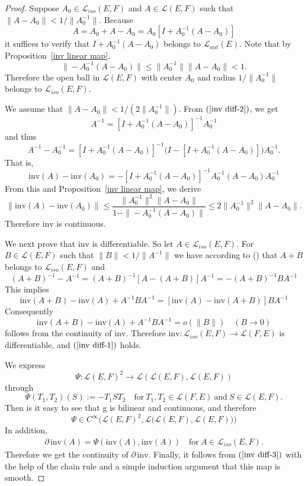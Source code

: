 \begin{proof}
Suppose $A_0\in\mathcal{L}_{iso}(E,F)$ and $A\in\mathcal{L}(E,F)$ such that $\|A-A_0\|<1/\|A_0^{-1}\|$. Because
\begin{equation}\label{inv diff-2}
A=A_0+A-A_0=A_0[I+A_0^{-1}(A-A_0)]
\end{equation}
it suffices to verify that $I+A_0^{-1}(A-A_0)$ belongs to $\mathcal{L}_{aut}(E)$. Note that by Proposition~\ref{inv linear map},
\[\|-A_0^{-1}(A-A_0)\|\leq \|A_0^{-1}\|\|A-A_0\|<1.\]
Therefore the open ball in $\mathcal{L}(E,F)$ with center $A_0$ and radius $1/\|A_0^{-1}\|$ belongs to $\mathcal{L}_{iso}(E,F)$.\par
We assume that $\|A-A_0\|<1/(2\|A_0^{-1}\|)$. From $(\ref{inv diff-2})$, we get
\[A^{-1}=[I+A_0^{-1}(A-A_0)]^{-1}A_0^{-1}\]
and thus
\[A^{-1}-A_0^{-1}=[I+A_0^{-1}(A-A_0)]^{-1}\Big(I-[I+A_0^{-1}(A-A_0)]\Big)A_0^{-1}.\]
That is,
\[\mathrm{inv}(A)-\mathrm{inv}(A_0)=-[I+A_0^{-1}(A-A_0)]^{-1}A_0^{-1}(A-A_0)A_0^{-1}\]
From this and Proposition~\ref{inv linear map}, we derive
\[\|\mathrm{inv}(A)-\mathrm{inv}(A_0)\|\leq \dfrac{\|A_0^{-1}\|^2\|A-A_0\|}{1-\|-A_0^{-1}(A-A_0)\|}\leq 2\|A_0^{-1}\|^2\|A-A_0\|.\]
Therefore $\mathrm{inv}$ is continuous.\par
We next prove that $\mathrm{inv}$ is differentiable. So let $A\in\mathcal{L}_{iso}(E,F)$. For $B\in\mathcal{L}(E,F)$ such that $\|B\|<1/\|A^{-1}\|$ we have according to () that $A+B$ belongs to $\mathcal{L}_{iso}(E,F)$ and
\[(A+B)^{-1}-A^{-1}=(A+B)^{-1}[A-(A+B)]A^{-1}=-(A+B)^{-1}BA^{-1}\]
This implies
\[\mathrm{inv}(A+B)-\mathrm{inv}(A)+A^{-1}BA^{-1}=[\mathrm{inv}(A)-\mathrm{inv}(A+B)]BA^{-1}\]
Consequently
\[\mathrm{inv}(A+B)-\mathrm{inv}(A)+A^{-1}BA^{-1}=o(\|B\|)\quad (B\to 0)\]
follows from the continuity of $\mathrm{inv}$. Therefore $\mathrm{inv}: \mathcal{L}_{iso}(E,F)\to\mathcal{L}(F,E)$ is differentiable, and $(\ref{inv diff-1})$ holds.\par
We express
\[\Psi:\mathcal{L}(E,F)^2\to\mathcal{L}(\mathcal{L}(E,F),\mathcal{L}(E,F))\]
through
\[\Psi(T_1,T_2)(S):=-T_1ST_2\quad\text{for}\ T_1,T_2\in\mathcal{L}(F,E)\ \text{and}\ S\in\mathcal{L}(E,F).\]
Then is it easy to see that g is bilinear and continuous, and therefore
\[\Psi\in C^{\infty}\big(\mathcal{L}(E,F)^2,\mathcal{L}\big(\mathcal{L}(E,F),\mathcal{L}(E,F)\big)\big)\]
In addition,
\begin{align}\label{inv diff-3}
\partial\,\mathrm{inv}(A)=\Psi(\mathrm{inv}(A),\mathrm{inv}(A))\quad\text{for}\ A\in\mathcal{L}_{iso}(E,F).
\end{align}
Therefore we get the continuity of $\partial\,\mathrm{inv}$. Finally, it follows from $(\ref{inv diff-3})$ with the help of the chain rule and a simple induction argument that this map is smooth.
\end{proof}
